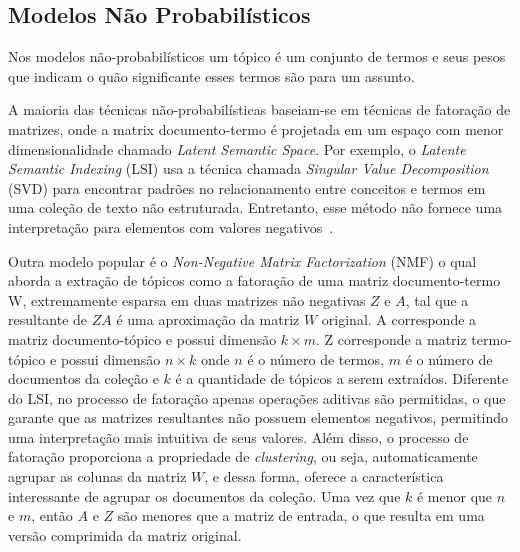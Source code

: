 \subsection{Modelos Não Probabilísticos}

Nos modelos não-probabilísticos um tópico é um conjunto de termos e seus pesos que indicam o quão significante esses termos são para um assunto.

A maioria das técnicas não-probabilísticas baseiam-se em técnicas de fatoração de matrizes, onde a matrix documento-termo é projetada em um espaço com menor dimensionalidade chamado \textit{Latent Semantic Space}. Por exemplo, o \textit{Latente Semantic Indexing} (LSI) usa a técnica chamada \textit{Singular Value Decomposition} (SVD) para encontrar padrões no relacionamento entre conceitos e termos em uma coleção de texto não estruturada. Entretanto, esse método não fornece uma interpretação para elementos com valores negativos~\cite{Cheng2013}. %

Outra modelo popular é o \textit{Non-Negative Matrix Factorization} (NMF) o qual aborda a extração de tópicos como a fatoração de uma matriz documento-termo W, extremamente esparsa em duas matrizes não negativas $Z$ e $A$, tal que a resultante de $ZA$ é uma aproximação da matriz $W$ original.  A corresponde a matriz documento-tópico e possui dimensão $k \times m$. Z corresponde a matriz termo-tópico e possui dimensão $n \times k$ onde $n$ é o número de termos, $m$ é o número de documentos da coleção e $k$ é a quantidade de tópicos a serem extraídos.  Diferente do LSI, no processo de fatoração apenas operações aditivas são permitidas, o que garante que as matrizes resultantes não possuem elementos negativos, permitindo uma interpretação mais intuitiva de seus valores. Além disso, o processo de fatoração proporciona a propriedade de \textit{clustering}, ou seja, automaticamente agrupar as colunas da matriz $W$, e dessa forma, oferece a característica interessante de agrupar os documentos da coleção. Uma vez que $k$ é menor que $n$ e $m$, então $A$ e $Z$ são menores que a matriz de entrada, o que resulta em uma versão comprimida da matriz original.

